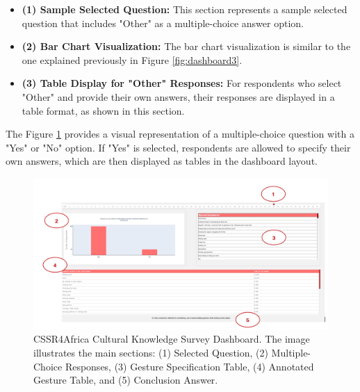 \documentclass{CSSRforAfrica}
\begin{document}
\begin{itemize}
    \item \textbf{(1) Sample Selected Question:} This section represents a sample selected question that includes "Other" as a multiple-choice answer option.
    
    \item \textbf{(2) Bar Chart Visualization:} The bar chart visualization is similar to the one explained previously in Figure \ref{fig:dashboard3}.
    
    \item \textbf{(3) Table Display for "Other" Responses:} For respondents who select "Other" and provide their own answers, their responses are displayed in a table format, as shown in this section.
\end{itemize}
\newpage
\noindent The Figure \ref{fig:dashboard5} provides a visual representation of a multiple-choice question with a "Yes" or "No" option. If "Yes" is selected, respondents are allowed to specify their own answers, which are then displayed as tables in the dashboard layout.

\begin{figure}[H]
    \centering
    \includegraphics[width=\textwidth]{images/dashboard55.png} 
    \caption{CSSR4Africa Cultural Knowledge Survey Dashboard. The image illustrates the main sections: (1) Selected Question, (2) Multiple-Choice Responses, (3) Gesture Specification Table, (4) Annotated Gesture Table, and (5) Conclusion Answer.}
    \label{fig:dashboard5}
\end{figure}
\end{document}
